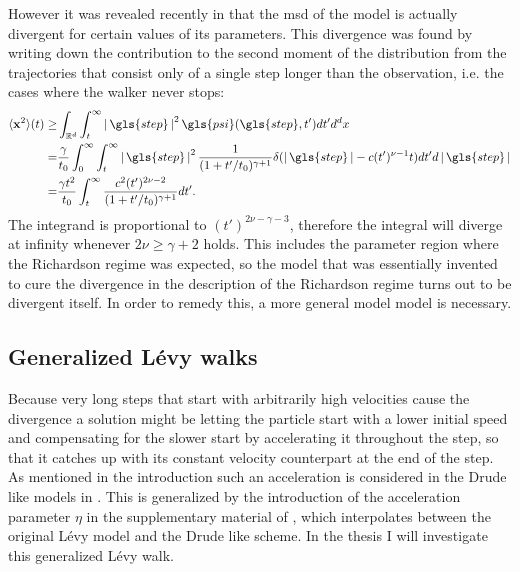 %
%

However it was revealed recently in \cite{radons2018} that the \gls{msd} of the model is actually divergent for certain values of its parameters. This divergence was found by writing down the contribution to the second moment of the distribution from the trajectories that consist only of a single step longer than the observation, i.e. the cases where the walker never stops:
%
\begin{align}
\mean{\ve{x}^2}(t) \geq& \int_{\mathbb{R}^d} \int_{t}^{\infty} \abs{\gls{step}}^{2} \gls{psi}(\gls{step},t') dt' d^{d}x \\
=& \frac{\gamma}{t_0} \int_{0}^{\infty} \int_{t}^{\infty} \abs{\gls{step}}^{2}  \frac{1}{(1+t'/t_0)^{\gamma+1}}  \delta(\abs{\gls{step}} - c (t')^{\nu-1}t)  dt' d\abs{\gls{step}} \\
=& \frac{\gamma t^2}{t_0}  \int_{t}^{\infty}   \frac{c^2 (t')^{2\nu-2}}{(1+t'/t_0)^{\gamma+1}}    dt'  .
\end{align}
%
The integrand is proportional to $(t')^{2\nu-\gamma-3}$, therefore the integral will diverge at infinity whenever $2 \nu \geq \gamma +2$ holds. This includes the parameter region where the Richardson regime was expected, so the model that was essentially invented to cure the divergence in the description of the Richardson regime turns out to be divergent itself. In order to remedy this, a more general model model is necessary.

\subsection{Generalized L\'evy walks}

Because very long steps that start with arbitrarily high velocities cause the divergence a solution might be letting the particle start with a lower initial speed and compensating for the slower start by accelerating it throughout the step, so that it catches up with its constant velocity counterpart at the end of the step. \\
As mentioned in the introduction such an acceleration is considered in the Drude like models in \cite{schulz1997, BarkaiKlafterBuch}. This is generalized by the introduction of the acceleration parameter $\eta$ in the supplementary material of \cite{radons2018}, which interpolates between the original L\'evy model and the Drude like scheme. In the thesis I will investigate this generalized L\'evy walk.

